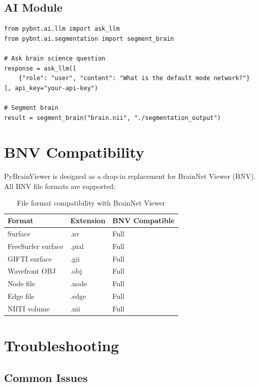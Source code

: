 \documentclass[11pt,a4paper]{article}
\begin{document}
\subsection{AI Module}

\begin{lstlisting}[caption=pybnt.ai]
from pybnt.ai.llm import ask_llm
from pybnt.ai.segmentation import segment_brain

# Ask brain science question
response = ask_llm([
    {"role": "user", "content": "What is the default mode network?"}
], api_key="your-api-key")

# Segment brain
result = segment_brain("brain.nii", "./segmentation_output")
\end{lstlisting}

\section{BNV Compatibility}

PyBrainViewer is designed as a drop-in replacement for BrainNet Viewer (BNV). All BNV file formats are supported:

\begin{table}[H]
\centering
\begin{tabular}{lll}
\toprule
\textbf{Format} & \textbf{Extension} & \textbf{BNV Compatible} \\
\midrule
Surface & .nv & Full \\
FreeSurfer surface & .pial & Full \\
GIFTI surface & .gii & Full \\
Wavefront OBJ & .obj & Full \\
Node file & .node & Full \\
Edge file & .edge & Full \\
NIfTI volume & .nii & Full \\
\bottomrule
\end{tabular}
\caption{File format compatibility with BrainNet Viewer}
\end{table}

\section{Troubleshooting}

\subsection{Common Issues}
\end{document}
